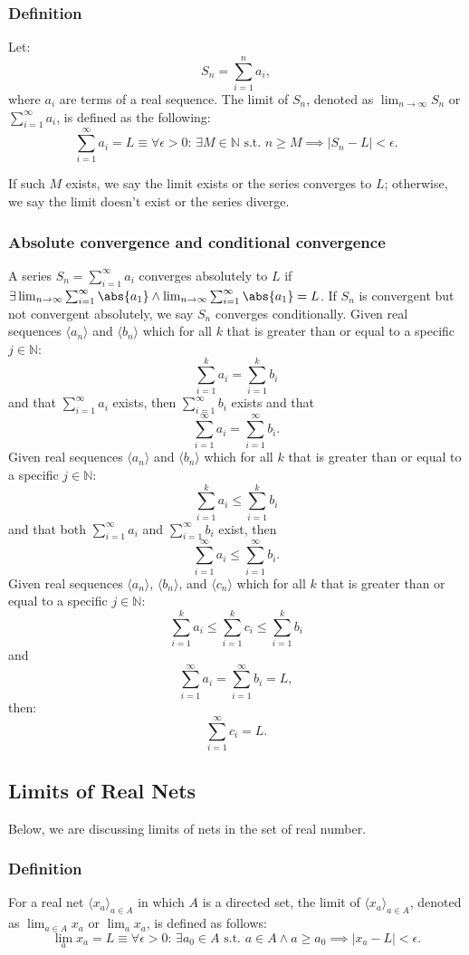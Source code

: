 \documentclass[a4paper,12pt]{report}
\begin{document}
\subsubsection{Definition}
Let:
\[S_n = \sum_{i=1}^n a_i,\]
where \(a_i\) are terms of a real sequence. The limit of \(S_n\), denoted as \(\lim_{n\to\infty}S_n\) or \(\sum_{i=1}^{\infty}a_i\), is defined as the following:
\[\sum_{i=1}^{\infty}a_i = L \equiv \forall \epsilon > 0:\, \exists M \in\mathbb{N}\text{\ s.t.\ } n \geq M\implies |S_n - L| < \epsilon.\]

If such $M$ exists, we say the limit exists or the series converges to $L$; otherwise, we say the limit doesn't exist or the series diverge.
\subsubsection{Absolute convergence and conditional convergence}
A series $S_n=\sum_{i=1}^{\infty}a_i$ converges absolutely to $L$ if $\exists\lim_{n\to\infty}\sum_{i=1}^{\infty}\abs{a_1}\land\lim_{n\to\infty}\sum_{i=1}^{\infty}\abs{a_1}=L$. If $S_n$ is convergent but not convergent absolutely, we say $S_n$ converges conditionally.
Given real sequences $\langle a_n\rangle$ and $\langle b_n\rangle$ which for all $k$ that is greater than or equal to a specific $j\in \mathbb{N}$:
\[\sum_{i=1}^ka_i=\sum_{i=1}^kb_i\]
and that $\sum_{i=1}^{\infty}a_i$ exists, then $\sum_{i=1}^{\infty}b_i$ exists and that
\[\sum_{i=1}^{\infty}a_i=\sum_{i=1}^{\infty}b_i.\]
Given real sequences $\langle a_n\rangle$ and $\langle b_n\rangle$ which for all $k$ that is greater than or equal to a specific $j\in \mathbb{N}$:
\[\sum_{i=1}^ka_i\leq\sum_{i=1}^kb_i\]
and that both $\sum_{i=1}^{\infty}a_i$ and $\sum_{i=1}^{\infty}b_i$ exist, then
\[\sum_{i=1}^{\infty}a_i\leq\sum_{i=1}^{\infty}b_i.\]
Given real sequences $\langle a_n\rangle$, $\langle b_n\rangle$, and $\langle c_n\rangle$ which for all $k$ that is greater than or equal to a specific $j\in \mathbb{N}$:
\[\sum_{i=1}^ka_i\leq\sum_{i=1}^kc_i\leq\sum_{i=1}^kb_i\]
and
\[\sum_{i=1}^{\infty}a_i=\sum_{i=1}^{\infty}b_i=L,\]
then: 
\[\sum_{i=1}^{\infty}c_i=L.\]
\subsection{Limits of Real Nets}
Below, we are discussing limits of nets in the set of real number.
\subsubsection{Definition}
For a real net $\langle x_a\rangle_{a\in A}$ in which $A$ is a directed set, the limit of $\langle x_a\rangle_{a\in A}$, denoted as $\lim_{a\in A} x_a$ or $\lim_a x_a$, is defined as follows:
\[\lim_ax_a = L \equiv \forall \epsilon > 0:\, \exists a_0 \in A\text{\ s.t.\ } a\in A\land a\ge a_0\implies |x_a - L| < \epsilon.\]
\end{document}

